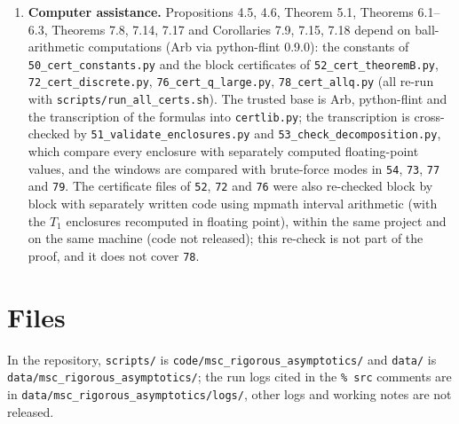 \documentclass[11pt,a4paper]{article}
\theoremstyle{definition}
\theoremstyle{remark}
\begin{document}
\begin{enumerate}
\item \textbf{Computer assistance.} Propositions 4.5, 4.6, Theorem 5.1, Theorems 6.1–6.3, Theorems 7.8, 7.14, 7.17 and Corollaries 7.9, 7.15, 7.18 depend on ball-arithmetic computations (Arb via python-flint 0.9.0): the constants of \texttt{50\_\allowbreak cert\_\allowbreak constants.py} and the block certificates of \texttt{52\_\allowbreak cert\_\allowbreak theoremB.py}, \texttt{72\_\allowbreak cert\_\allowbreak discrete.py}, \texttt{76\_\allowbreak cert\_\allowbreak q\_\allowbreak large.py}, \texttt{78\_\allowbreak cert\_\allowbreak allq.py} (all re-run with \texttt{scripts/\allowbreak run\_\allowbreak all\_\allowbreak certs.sh}). The trusted base is Arb, python-flint and the transcription of the formulas into \texttt{certlib.py}; the transcription is cross-checked by \texttt{51\_\allowbreak validate\_\allowbreak enclosures.py} and \texttt{53\_\allowbreak check\_\allowbreak decomposition.py}, which compare every enclosure with separately computed floating-point values, and the windows are compared with brute-force modes in \texttt{54}, \texttt{73}, \texttt{77} and \texttt{79}. The certificate files of \texttt{52}, \texttt{72} and \texttt{76} were also re-checked block by block with separately written code using mpmath interval arithmetic (with the $T_1$ enclosures recomputed in floating point), within the same project and on the same machine (code not released); this re-check is not part of the proof, and it does not cover \texttt{78}.
\end{enumerate}

\appendix
\section{Files}

In the repository, \texttt{scripts/} is \texttt{code/\allowbreak msc\_\allowbreak rigorous\_\allowbreak asymptotics/} and \texttt{data/} is \texttt{data/\allowbreak msc\_\allowbreak rigorous\_\allowbreak asymptotics/}; the run logs cited in the \texttt{\%~src} comments are in \texttt{data/\allowbreak msc\_\allowbreak rigorous\_\allowbreak asymptotics/\allowbreak logs/}, other logs and working notes are not released.
\end{document}
